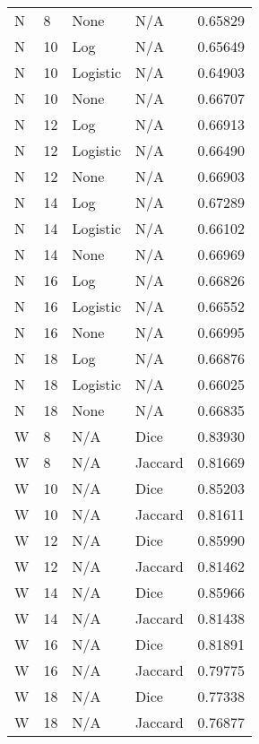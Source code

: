 \documentclass{article}
\begin{document}
\begin{center}
\begin{supertabular}{| l | l | l | l | l |}
               N & 8 & None & N/A & 0.65829 \\
               N & 10 & Log & N/A & 0.65649 \\
               N & 10 & Logistic & N/A & 0.64903 \\
               N & 10 & None & N/A & 0.66707 \\
               N & 12 & Log & N/A & 0.66913 \\
               N & 12 & Logistic & N/A & 0.66490 \\
               N & 12 & None & N/A & 0.66903 \\
               N & 14 & Log & N/A & 0.67289 \\
               N & 14 & Logistic & N/A & 0.66102 \\
               N & 14 & None & N/A & 0.66969 \\
               N & 16 & Log & N/A & 0.66826 \\
               N & 16 & Logistic & N/A & 0.66552 \\
               N & 16 & None & N/A & 0.66995 \\
               N & 18 & Log & N/A & 0.66876 \\
               N & 18 & Logistic & N/A & 0.66025 \\
               N & 18 & None & N/A & 0.66835 \\
               W & 8 & N/A & Dice & 0.83930 \\
               W & 8 & N/A & Jaccard & 0.81669 \\
               W & 10 & N/A & Dice & 0.85203 \\
               W & 10 & N/A & Jaccard & 0.81611 \\
               W & 12 & N/A & Dice & 0.85990 \\
               W & 12 & N/A & Jaccard & 0.81462 \\
               W & 14 & N/A & Dice & 0.85966 \\
               W & 14 & N/A & Jaccard & 0.81438 \\
               W & 16 & N/A & Dice & 0.81891 \\
               W & 16 & N/A & Jaccard & 0.79775 \\
               W & 18 & N/A & Dice & 0.77338 \\
               W & 18 & N/A & Jaccard & 0.76877 \\
         \end{supertabular}
   \end{center}
\end{document}

